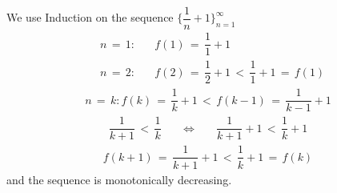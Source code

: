 \begin{example}
We use Induction on the sequence $\Big\{\dfrac{1}{n} + 1\Big\}_{n=1}^{\infty}$
\begin{align*}
    &n \hspace{2pt} = \hspace{2pt} 1: \hspace{20pt} f(1) \hspace{2pt} = \hspace{2pt} \dfrac{1}{1} + 1\\[2ex]
    &n \hspace{2pt} = \hspace{2pt} 2: \hspace{20pt} f(2) \hspace{2pt} = \hspace{2pt} \dfrac{1}{2} + 1 \hspace{2pt} < \hspace{2pt} \dfrac{1}{1} + 1 \hspace{2pt} = \hspace{2pt} f(1)
\end{align*}
\begin{align*}    
    n \hspace{2pt} = \hspace{2pt} k: f(k) \hspace{2pt} = \hspace{2pt} \dfrac{1}{k} + 1 \hspace{2pt} < \hspace{2pt} f(k-1) \hspace{2pt} = \hspace{2pt} \dfrac{1}{k-1} + 1
\end{align*}
\begin{align*}
    \dfrac{1}{k+1} \hspace{2pt} < \hspace{2pt} \dfrac{1}{k} \hspace{20pt} \Longleftrightarrow \hspace{20pt} \dfrac{1}{k+1} + 1 \hspace{2pt} < \hspace{2pt} \dfrac{1}{k} + 1
\end{align*}
\begin{align*}
    f(k+1) \hspace{2pt} = \hspace{2pt} \dfrac{1}{k+1} + 1 \hspace{2pt} < \hspace{2pt} \dfrac{1}{k} + 1 \hspace{2pt} = \hspace{2pt} f(k)
\end{align*}
and the sequence is monotonically decreasing.
\end{example}

